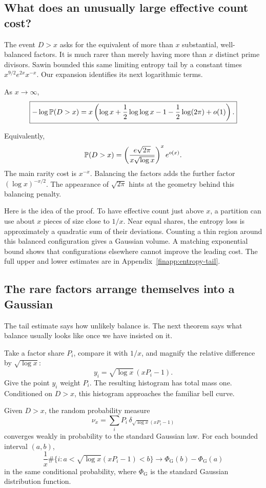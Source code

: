 \subsection{What does an unusually large effective count cost?}
The event $D>x$ asks for the equivalent of more than $x$ substantial,
well-balanced factors.  It is much rarer than merely having more than
$x$ distinct prime divisors.
Sawin \cite[Lemma 9.5]{finSawin} bounded this same limiting entropy tail
by a constant times $x^{9/2}e^{2x}x^{-x}$.
Our expansion identifies its next logarithmic terms.
\begin{theorem}\label{fin:entropytail}
As $x\to\infty$,
\[
 \boxed{-\log\mathbb P(D>x)
 =x\left(\log x+\frac12\log\log x
              -1-\frac12\log(2\pi)+o(1)\right).}
\]
\end{theorem}

Equivalently,
\[
 \mathbb P(D>x)=
 \left(\frac{e\sqrt{2\pi}}{x\sqrt{\log x}}\right)^x e^{o(x)}.
\]
The main rarity cost is $x^{-x}$.
Balancing the factors adds the further factor
$(\log x)^{-x/2}$.  The appearance of $\sqrt{2\pi}$ hints at the
geometry behind this balancing penalty.

Here is the idea of the proof.  To have effective count just above
$x$, a partition can use about $x$ pieces of size close to $1/x$.
Near equal shares, the entropy loss is approximately a quadratic
sum of their deviations.  Counting a thin region around this balanced
configuration gives a Gaussian volume.  A matching exponential bound
shows that configurations elsewhere cannot improve the leading cost.
The full upper and lower estimates are in
Appendix~\ref{finapp:entropy-tail}.

\subsection{The rare factors arrange themselves into a Gaussian}
The tail estimate says how unlikely balance is.
The next theorem says what balance usually looks like once we have
insisted on it.

Take a factor share $P_i$, compare it with $1/x$, and magnify the
relative difference by $\sqrt{\log x}$:
\[
 y_i=\sqrt{\log x}\,(xP_i-1).
\]
Give the point $y_i$ weight $P_i$.
The resulting histogram has total mass one.
Conditioned on $D>x$, this histogram approaches the familiar bell curve.
\begin{theorem}\label{fin:entropyprofile}
Given $D>x$, the random probability measure
\[
 \nu_x=\sum_i P_i\,\delta_{\sqrt{\log x}(xP_i-1)}
\]
converges weakly in probability to the standard Gaussian law.
For each bounded interval $(a,b)$,
\[
 \frac1x\#\{i:a<\sqrt{\log x}(xP_i-1)<b\}
 \longrightarrow \Phi_{\mathrm G}(b)-\Phi_{\mathrm G}(a)
\]
in the same conditional probability, where $\Phi_{\mathrm G}$ is the
standard Gaussian distribution function.
\end{theorem}

